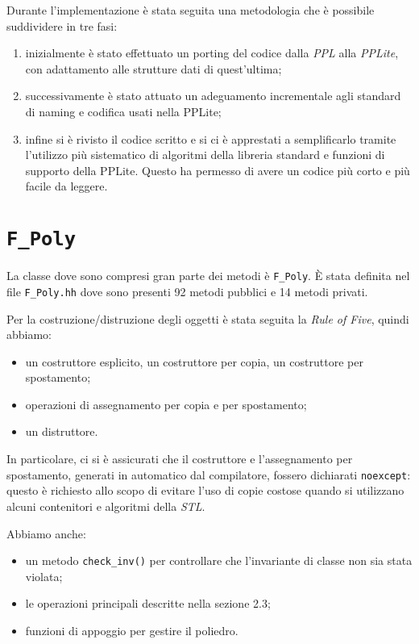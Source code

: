 \documentclass{mimosis}
\theoremstyle{definition}
\begin{document}
Durante l'implementazione è stata seguita una metodologia che è possibile suddividere in tre fasi:

\begin{enumerate}
\item inizialmente è stato effettuato un porting del codice dalla \emph{PPL} alla
\emph{PPLite}, con adattamento alle strutture dati di quest'ultima;
\item successivamente è stato attuato un adeguamento incrementale agli standard di
naming e codifica usati nella PPLite;
\item infine si è rivisto il codice scritto e si ci è apprestati a semplificarlo
tramite l'utilizzo più sistematico di algoritmi della libreria standard e
funzioni di supporto della PPLite. Questo ha permesso di avere un codice più
corto e più facile da leggere.
\end{enumerate}

\section{\texttt{F\_Poly}}
\label{sec:orgd97b69c}
La classe dove sono compresi gran parte dei metodi è \texttt{F\_Poly}. È stata
definita nel file \texttt{F\_Poly.hh} dove sono presenti 92 metodi pubblici e 14 metodi
privati.

Per la costruzione/distruzione degli oggetti è stata seguita la
\emph{Rule of Five}, quindi abbiamo:

\begin{itemize}
\item un costruttore esplicito, un costruttore per copia, un costruttore per spostamento;
\item operazioni di assegnamento per copia e per spostamento;
\item un distruttore.
\end{itemize}

In particolare, ci si è assicurati che il costruttore e l'assegnamento per
spostamento, generati in automatico dal compilatore, fossero dichiarati \texttt{noexcept}: questo è richiesto allo scopo di
evitare l'uso di copie costose quando si utilizzano alcuni contenitori e
algoritmi della \emph{STL}.

Abbiamo anche:

\begin{itemize}
\item un metodo \texttt{check\_inv()} per controllare che l'invariante di classe non sia
stata violata;
\item le operazioni principali descritte nella sezione 2.3;
\item funzioni di appoggio per gestire il poliedro.
\end{itemize}
\end{document}
